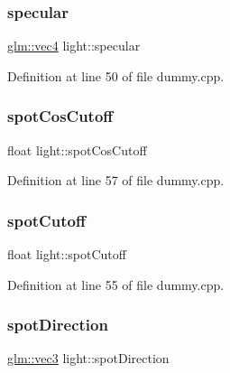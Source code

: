 \mbox{\label{structlight_a03121f7e82d16d3b67fa0cd3efc30eb6}} 
\subsubsection{\texorpdfstring{specular}{specular}}
{\footnotesize\ttfamily \hyperlink{group__core__types_ga5881b1b022d7fd1b7218f5916532dd02}{glm\+::vec4} light\+::specular}



Definition at line 50 of file dummy.\+cpp.

\mbox{\label{structlight_a25376f0a1e32235d50ef14edfa18bfb3}} 
\subsubsection{\texorpdfstring{spot\+Cos\+Cutoff}{spotCosCutoff}}
{\footnotesize\ttfamily float light\+::spot\+Cos\+Cutoff}



Definition at line 57 of file dummy.\+cpp.

\mbox{\label{structlight_ae9caaef52485008773b4169e8ca71def}} 
\subsubsection{\texorpdfstring{spot\+Cutoff}{spotCutoff}}
{\footnotesize\ttfamily float light\+::spot\+Cutoff}



Definition at line 55 of file dummy.\+cpp.

\mbox{\label{structlight_a24ba4cefe6d7757dd48be420ac70713e}} 
\subsubsection{\texorpdfstring{spot\+Direction}{spotDirection}}
{\footnotesize\ttfamily \hyperlink{group__core__types_ga1c47e8b3386109bc992b6c48e91b0be7}{glm\+::vec3} light\+::spot\+Direction}



